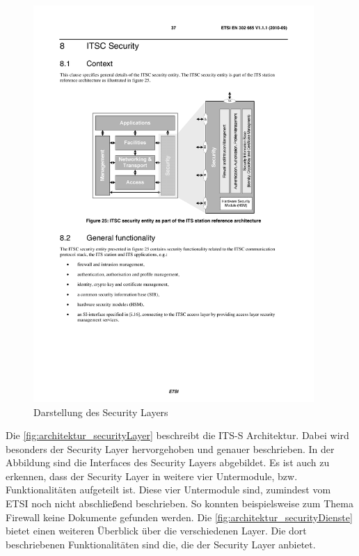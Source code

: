 \begin{figure}
	\includegraphics[width=0.95\textwidth]{content/images/02_architektur/securityLayer.pdf}
	\caption{Darstellung des Security Layers \cite{en302665}}
	\label{fig:architektur_securityLayer}
\end{figure}


Die \autoref{fig:architektur_securityLayer}  beschreibt die \ac{ITS-S} Architektur. Dabei wird besonders der Security Layer hervorgehoben und genauer beschrieben. In der Abbildung sind die Interfaces des Security Layers abgebildet. Es ist auch zu erkennen, dass der Security Layer in weitere vier Untermodule, bzw. Funktionalitäten aufgeteilt ist. Diese vier Untermodule sind, zumindest vom \ac{ETSI} noch nicht abschließend beschrieben. So konnten beispielsweise zum Thema Firewall keine Dokumente gefunden werden. Die \autoref{fig:architektur_securityDienste} bietet einen weiteren Überblick über die verschiedenen Layer. Die dort beschriebenen Funktionalitäten sind die, die der Security Layer anbietet.  

